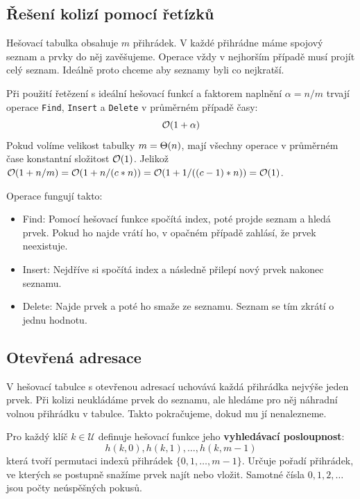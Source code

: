 \subsection{Řešení kolizí pomocí řetízků}

Hešovací tabulka obsahuje $m$ přihrádek. V každé přihrádne máme spojový seznam a prvky do něj zavěšujeme. Operace vždy v nejhorším případě musí projít celý seznam. Ideálně proto chceme aby seznamy byli co nejkratší.



\begin{theorem}
Při použití řetězení s ideální hešovací funkcí a faktorem naplnění $\alpha = n/m$ trvají operace \texttt{Find}, \texttt{Insert} a \texttt{Delete} v průměrném případě časy:
$$\mathcal{O}(1 + \alpha)$$
Pokud volíme velikost tabulky $m = \Theta(n)$, mají všechny operace v průměrném čase konstantní složitost $\mathcal{O}(1)$. Jelikož $\mathcal{O}(1 + n/m) = \mathcal{O}(1 + n/(c*n)) = \mathcal{O}(1 + 1/((c-1)*n)) = \mathcal{O}(1)$.
\end{theorem}

\medskip

\noindent Operace fungují takto:
\begin{itemize}
    \item Find: Pomocí hešovací funkce spočítá index, poté projde seznam a hledá prvek. Pokud ho najde vrátí ho, v opačném případě zahlásí, že prvek neexistuje.
    \item Insert: Nejdříve si spočítá index a následně přilepí nový prvek nakonec seznamu.
    \item Delete: Najde prvek a poté ho smaže ze seznamu. Seznam se tím zkrátí o jednu hodnotu.
\end{itemize}

\subsection{Otevřená adresace}

V hešovací tabulce s otevřenou adresací uchovává každá přihrádka nejvýše jeden prvek. Při kolizi neukládáme prvek do seznamu, ale hledáme pro něj náhradní volnou přihrádku v tabulce. Takto pokračujeme, dokud mu jí nenalezneme.

\begin{definition}
Pro každý klíč $k \in \mathcal{U}$ definuje hešovací funkce jeho \textbf{vyhledávací posloupnost}:
$$h(k, 0), h(k, 1), \dots, h(k, m-1)$$
která tvoří permutaci indexů přihrádek $\{0, 1, \dots, m-1\}$. Určuje pořadí přihrádek, ve kterých se postupně snažíme prvek najít nebo vložit. Samotné čísla $0,1,2,\dots$ jsou počty neúspěšných pokusů.
\end{definition}

